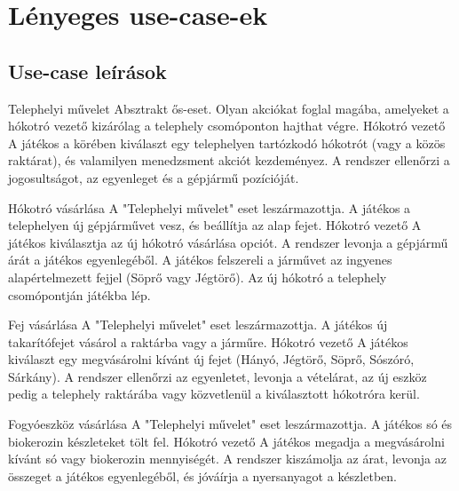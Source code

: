\section{Lényeges use-case-ek}
\subsection{Use-case leírások}

\begin{use-case}
    {Telephelyi művelet}
    {Absztrakt ős-eset. Olyan akciókat foglal magába, amelyeket a hókotró vezető kizárólag a telephely csomóponton hajthat végre.}
    {Hókotró vezető}
    A játékos a körében kiválaszt egy telephelyen tartózkodó hókotrót (vagy a közös raktárat), és valamilyen menedzsment akciót kezdeményez. A rendszer ellenőrzi a jogosultságot, az egyenleget és a gépjármű pozícióját. 
\end{use-case}

\begin{use-case}
    {Hókotró vásárlása}
    {A "Telephelyi művelet" eset leszármazottja. A játékos a telephelyen új gépjárművet vesz, és beállítja az alap fejet.}
    {Hókotró vezető}
    A játékos kiválasztja az új hókotró vásárlása opciót. A rendszer levonja a gépjármű árát a játékos egyenlegéből. A játékos felszereli a járművet az ingyenes alapértelmezett fejjel (Söprő vagy Jégtörő). Az új hókotró a telephely csomópontján játékba lép.
\end{use-case}

\begin{use-case}
    {Fej vásárlása}
    {A "Telephelyi művelet" eset leszármazottja. A játékos új takarítófejet vásárol a raktárba vagy a járműre.}
    {Hókotró vezető}
    A játékos kiválaszt egy megvásárolni kívánt új fejet (Hányó, Jégtörő, Söprő, Sószóró, Sárkány). A rendszer ellenőrzi az egyenletet, levonja a vételárat, az új eszköz pedig a telephely raktárába vagy közvetlenül a kiválasztott hókotróra kerül.
\end{use-case}

\begin{use-case}
    {Fogyóeszköz vásárlása}
    {A "Telephelyi művelet" eset leszármazottja. A játékos só és biokerozin készleteket tölt fel.}
    {Hókotró vezető}
    A játékos megadja a megvásárolni kívánt só vagy biokerozin mennyiségét. A rendszer kiszámolja az árat, levonja az összeget a játékos egyenlegéből, és jóváírja a nyersanyagot a készletben.
\end{use-case}

